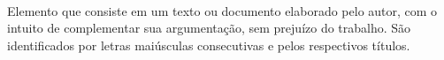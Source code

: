 \paragraph{}Elemento que consiste em um texto ou documento elaborado pelo autor, com o intuito de complementar sua argumentação, sem prejuízo do trabalho. São identificados por letras maiúsculas consecutivas e pelos respectivos títulos.